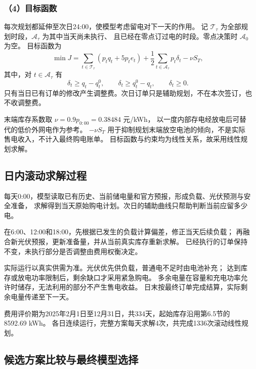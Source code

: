 \subsubsection*{（4）目标函数}

每次规划都延伸至次日24:00，使模型考虑留电对下一天的作用。
记 $\mathcal T_{\tau}$ 为全部规划时段，$\mathcal A_{\tau}$ 为其中当天尚未执行、
且已经在零点订过电的时段。零点决策时 $\mathcal A_0$ 为空。
目标函数为
\begin{equation}
\min J=\sum_{t\in\mathcal T_{\tau}}(p_tq_t+5p_te_t)
+\frac12\sum_{t\in\mathcal A_{\tau}}p_t\delta_t-\nu S_T,
\end{equation}
其中，对 $t\in\mathcal A_{\tau}$ 有
\begin{equation}
\delta_t\geq q_t-q_t^0,\qquad
\delta_t\geq q_t^0-q_t,\qquad\delta_t\geq0.
\end{equation}
只有当日已有订单的修改产生调整费。次日订单只是辅助规划，不在本次签订，也不收调整费。

末端库存系数取 $\nu=0.9p_{0:00}=0.38484$ 元/kWh，
以一度内部存电经放电后可替代的低价外网电作为参考。
$-\nu S_T$ 用于抑制规划末端放空电池的倾向，不是实际售电收入，不计入最终购电账单。
目标函数与约束均为线性关系，故采用线性规划求解。

\subsection{日内滚动求解过程}

每天0:00，模型读取已有历史、当前储电量和官方预报，形成负载、光伏预测与安全准备，
求解得到当天原始购电计划。次日的辅助曲线只帮助判断当前应留多少电。

在6:00、12:00和18:00，先根据已发生的负载计算偏差，修正当天后续负载；
再融合新光伏预报，更新准备量，并从当前真实库存重新求解。
已经执行的订单保持不变，未执行部分是否调整由费用权衡决定。

实际运行以真实供需为准。光伏优先供负载，普通电不足时由电池补充；
达到库存或放电功率限制后，剩余缺口才采用紧急购电。
多余电量在容量和充电功率允许时储存，无法利用的部分不产生售电收益。
日末按最终订单完成结算，实际剩余电量传递至下一天。

费用评价期为2025年2月1日至12月31日，共334天，起始库存沿用第6.5节的8592.69 kWh。
各日连续运行，完整方案每天求解4次，共完成1336次滚动线性规划。

\subsection{候选方案比较与最终模型选择}

